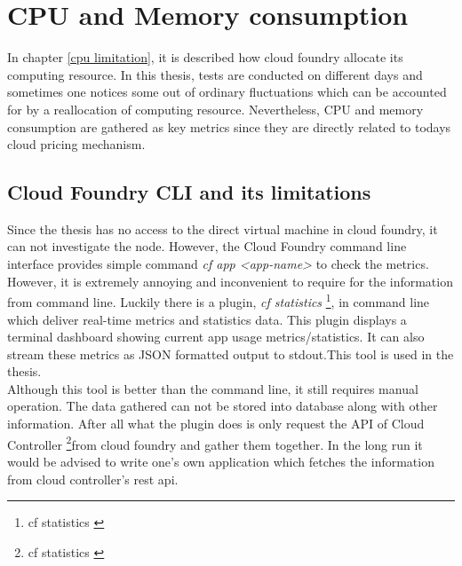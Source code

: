 \section{CPU and Memory consumption}
In chapter \ref{cpu limitation}, it is described how cloud foundry allocate its computing resource. In this thesis, tests are conducted on different days and sometimes one notices some out of ordinary fluctuations which can be accounted for by a reallocation of computing resource. Nevertheless, CPU and memory consumption are gathered as key metrics since they are directly related to todays cloud pricing mechanism.
\subsection{Cloud Foundry CLI and its limitations}
Since the thesis has no access to the direct virtual machine in cloud foundry, it can not investigate the node. However, the Cloud Foundry command line interface provides simple command \textit{cf app <app-name>} to check the metrics. However, it is extremely annoying and inconvenient to require for the information from command line. Luckily there is a plugin, \textit{cf statistics} \footnote{cf statistics \citep{cfstatistics}},  in command line which deliver real-time metrics and statistics data. This plugin displays a terminal dashboard showing current app usage metrics/statistics. It can also stream these metrics as JSON formatted output to stdout.This tool is used in the thesis. \\
Although this tool is better than the command line, it still requires manual operation. The data gathered can not be stored into database along with other information. After all what the plugin does is only request the API of Cloud Controller  \footnote{cf statistics \citep{cloudcontroller}}from cloud foundry and gather them together. In the long run it would be advised to write one's own application which fetches the information from cloud controller's rest api. 
